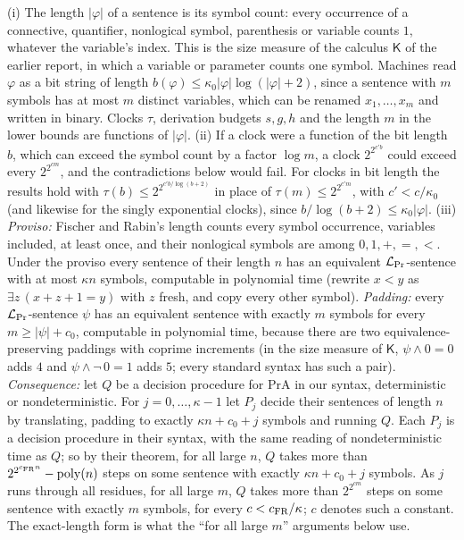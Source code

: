 \begin{remark}[Lengths]\label{rem:soi:lengths}
(i) The length $\lvert\varphi\rvert$ of a sentence is its symbol count: every occurrence of a connective, quantifier, nonlogical symbol, parenthesis or variable counts $1$, whatever the variable's index. This is the size measure of the calculus $\mathsf K$ of the earlier report, in which a variable or parameter counts one symbol. Machines read $\varphi$ as a bit string of length $b(\varphi)\le\kappa_0\lvert\varphi\rvert\log(\lvert\varphi\rvert+2)$, since a sentence with $m$ symbols has at most $m$ distinct variables, which can be renamed $x_1,\dots,x_m$ and written in binary. Clocks $\tau$, derivation budgets $s,g,h$ and the length $m$ in the lower bounds are functions of $\lvert\varphi\rvert$.
(ii) If a clock were a function of the bit length $b$, which can exceed the symbol count by a factor $\log m$, a clock $2^{2^{c'b}}$ could exceed every $2^{2^{cm}}$, and the contradictions below would fail. For clocks in bit length the results hold with $\tau(b)\le2^{2^{c'b/\log(b+2)}}$ in place of $\tau(m)\le2^{2^{c'm}}$, with $c'<c/\kappa_0$ (and likewise for the singly exponential clocks), since $b/\log(b+2)\le\kappa_0\lvert\varphi\rvert$.
(iii) \emph{Proviso:} Fischer and Rabin's length counts every symbol occurrence, variables included, at least once, and their nonlogical symbols are among $0,1,+,=,<$. Under the proviso every sentence of their length $n$ has an equivalent $\mathcal L_{\rm Pr}$-sentence with at most $\kappa n$ symbols, computable in polynomial time (rewrite $x<y$ as $\exists z\,(x+z+1=y)$ with $z$ fresh, and copy every other symbol). \emph{Padding:} every $\mathcal L_{\rm Pr}$-sentence $\psi$ has an equivalent sentence with exactly $m$ symbols for every $m\ge\lvert\psi\rvert+c_0$, computable in polynomial time, because there are two equivalence-preserving paddings with coprime increments (in the size measure of $\mathsf K$, $\psi\wedge0=0$ adds $4$ and $\psi\wedge\neg\,0=1$ adds $5$; every standard syntax has such a pair). \emph{Consequence:} let $Q$ be a decision procedure for $\mathrm{PrA}$ in our syntax, deterministic or nondeterministic. For $j=0,\dots,\kappa-1$ let $P_j$ decide their sentences of length $n$ by translating, padding to exactly $\kappa n+c_0+j$ symbols and running $Q$. Each $P_j$ is a decision procedure in their syntax, with the same reading of nondeterministic time as $Q$; so by their theorem, for all large $n$, $Q$ takes more than $2^{2^{c_{\rm FR}n}}-\mathrm{poly}(n)$ steps on some sentence with exactly $\kappa n+c_0+j$ symbols. As $j$ runs through all residues, for all large $m$, $Q$ takes more than $2^{2^{cm}}$ steps on some sentence with exactly $m$ symbols, for every $c<c_{\rm FR}/\kappa$; $c$ denotes such a constant. The exact-length form is what the ``for all large $m$'' arguments below use.
\end{remark}

